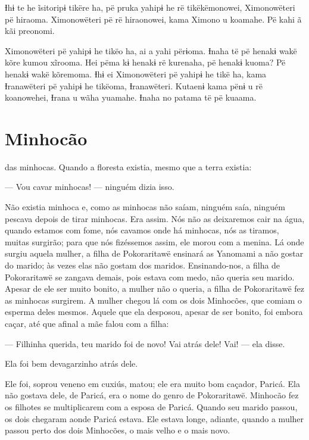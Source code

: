 Ɨhɨ te he ĩsitoripɨ tikëre ha, pë pruka yahipɨ he rë tikëkëmonowei,
Ximonowëteri pë hiraoma. Ximonowëteri pë rë hiraonowei, kama Ximono u
koamahe. Pë kahi ã kãi preonomi. 

Ximonowëteri pë yahipɨ he tikëo ha, ai a yahi përɨoma. Ɨnaha të pë
henakɨ wakë kõre kumou xĩrooma. Hei pëma kɨ henakɨ rë kurenaha, pë
henakɨ kuoma? Pë henakɨ wakë kõremoma. Ɨhɨ ei Ximonowëteri pë yahipɨ he
tikë ha, kama Ɨranawëteri pë yahipɨ he tikëoma, Ɨranawëteri. Kutaenɨ
kama pënɨ u rë koanowehei, Ɨrana u wãha yuamahe. Ɨnaha no patama të pë
kuaama. 

\chapter{Minhocão}
 
 das minhocas. Quando a floresta existia, mesmo que a terra
existia: 

--- Vou cavar minhocas! --- ninguém dizia isso. 

Não existia minhoca e, como as minhocas não saíam, ninguém saía, ninguém
pescava depois de tirar minhocas. Era assim. Nós não as deixaremos cair
na água, quando estamos com fome, nós cavamos onde há minhocas, nós as
tiramos, muitas surgirão; para que nós fizéssemos assim, ele morou com a
menina. Lá onde surgiu aquela mulher, a filha de Pokoraritawë ensinará
as Yanomami a não gostar do marido;  às vezes elas não gostam dos maridos. Ensinando-nos, a filha de Pokoraritawë se zangava demais, pois
estava com medo, não queria seu marido. Apesar de ele ser muito bonito,
a mulher não o queria, a filha de Pokoraritawë fez as minhocas surgirem.
A mulher chegou lá com os dois Minhocões, que comiam o esperma deles
mesmos. Aquele que ela desposou, apesar de ser bonito, foi embora caçar,
até que afinal a mãe falou com a filha: 

--- Filhinha querida, teu marido foi de novo! Vai atrás dele! Vai! ---
ela disse. 

Ela foi bem devagarzinho atrás dele. 

Ele foi, soprou veneno em cuxiús, matou; ele era muito bom caçador,
Paricá. Ela não gostava dele, de Paricá, era o nome do genro de
Pokoraritawë. Minhocão fez os filhotes se multiplicarem com a esposa de
Paricá. Quando seu marido passou, os dois chegaram aonde Paricá estava.
Ele estava longe, adiante, quando a mulher passou perto dos dois
Minhocões, o mais velho e o mais novo. 


